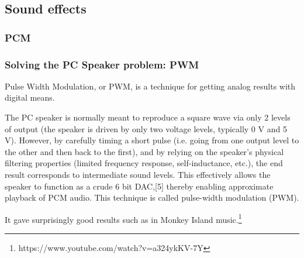 \subsection{Sound effects}
\par
\begin{figure}[H]
\centering
 \end{figure}
\par

\subsubsection{PCM}


\subsubsection{Solving the PC Speaker problem: PWM}
Pulse Width Modulation, or PWM, is a technique for getting analog results with digital means.




\par
 \begin{fancyquotes}
  The PC speaker is normally meant to reproduce a square wave via only 2 levels of output (the speaker is driven by only two voltage levels, typically 0 V and 5 V). However, by carefully timing a short pulse (i.e. going from one output level to the other and then back to the first), and by relying on the speaker's physical filtering properties (limited frequency response, self-inductance, etc.), the end result corresponds to intermediate sound levels. This effectively allows the speaker to function as a crude 6 bit DAC,[5] thereby enabling approximate playback of PCM audio. This technique is called pulse-width modulation (PWM).
 \end{fancyquotes}
\par
  It gave surprisingly good results such as in Monkey Island music.\footnote{https://www.youtube.com/watch?v=a324ykKV-7Y}

